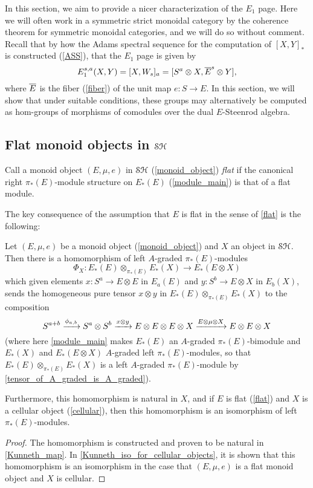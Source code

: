 \documentclass[../main.tex]{subfiles}
\begin{document}
In this section, we aim to provide a nicer characterization of the $E_1$ page. Here we will often work in a symmetric strict monoidal category by the coherence theorem for symmetric monoidal categories, and we will do so without comment. Recall that by how the Adams spectral sequence for the computation of $[X,Y]_*$ is constructed (\autoref{ASS}), that the $E_1$ page is given by
\[E_1^{s,a}(X,Y)=[X,W_s]_a=[S^a\otimes X,{\overline E}^s\otimes Y],\]
where $\overline E$ is the fiber (\autoref{fiber}) of the unit map $e:S\to E$.  In this section, we will show that under suitable conditions, these groups may alternatively be computed as hom-groups of morphisms of comodules over the dual $E$-Steenrod algebra.

\subsection{Flat monoid objects in \texorpdfstring{$\mathcal{SH}$}{SH}}

\begin{definition}\label{flat}
    Call a monoid object $(E,\mu,e)$ in $\mathcal{SH}$ (\autoref{monoid_object}) \emph{flat} if the canonical right $\pi_*(E)$-module structure on $E_*(E)$ (\autoref{module_main}) is that of a flat module.
\end{definition}

The key consequence of the assumption that $E$ is flat in the sense of \autoref{flat} is the following:

\begin{proposition}\label{Kunneth_map_iso_main}
    Let $(E,\mu,e)$ be a monoid object (\autoref{monoid_object}) and $X$ an object in $\mathcal{SH}$. Then there is a homomorphism of left $A$-graded $\pi_*(E)$-modules
    \[\Phi_X:E_*(E)\otimes_{\pi_*(E)}E_*(X)\to E_*(E\otimes X)\]
    which given elements $x:S^a\to E\otimes E$ in $E_a(E)$  and $y:S^b\to E\otimes X$ in $E_b(X)$, sends the homogeneous pure tensor $x\otimes y$ in $E_*(E)\otimes_{\pi_*(E)}E_*(X)$ to the composition
    \[S^{a+b}\xrightarrow{\phi_{a,b}}S^a\otimes S^b\xrightarrow{x\otimes y}E\otimes E\otimes E\otimes X\xrightarrow{E\otimes\mu\otimes X}E\otimes E\otimes X\]
    (where here \autoref{module_main} makes $E_*(E)$ an $A$-graded $\pi_*(E)$-bimodule and $E_*(X)$ and $E_*(E\otimes X)$ $A$-graded left $\pi_*(E)$-modules, so that $E_*(E)\otimes_{\pi_*(E)}E_*(X)$ is a left $A$-graded $\pi_*(E)$-module by \autoref{tensor_of_A_graded_is_A_graded}).

    Furthermore, this homomorphism is natural in $X$, and if $E$ is flat (\autoref{flat}) and $X$ is a cellular object (\autoref{cellular}), then this homomorphism is an isomorphism of left $\pi_*(E)$-modules.
\end{proposition}
\begin{proof}
    The homomorphism is constructed and proven to be natural in \autoref{Kunneth_map}. In \autoref{Kunneth_iso_for_cellular_objects}, it is shown that this homomorphism is an isomorphism in the case that $(E,\mu,e)$ is a flat monoid object and $X$ is cellular.
\end{proof}
\end{document}
